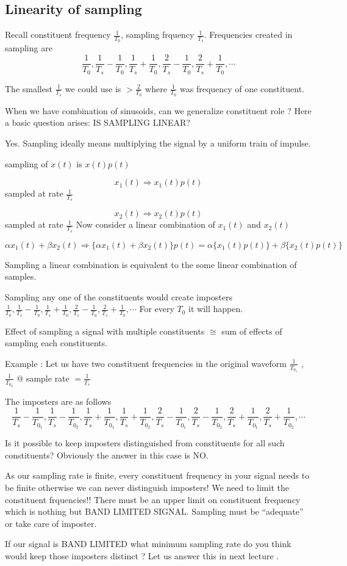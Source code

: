 \subsection{Linearity of sampling}
Recall constituent frequency $\frac{1}{T_0}$, sampling frquency $\frac{1}{T_s}$. Frequencies created in sampling are $$\frac{1}{T_0},\frac{1}{T_s}-\frac{1}{T_0},\frac{1}{T_s}+\frac{1}{T_0} ,\frac{2}{T_s}-\frac{1}{T_0},\frac{2}{T_s}+\frac{1}{T_0} , \cdots$$

The smallest $\frac{1}{T_s}$ we could use is $> \frac{2}{T_0}$ where $\frac{1}{T_0}$ was frequency of one constituent.

When we have combination of sinusoids, can we generalize constituent role ? 
Here a basic question arises: IS SAMPLING LINEAR?

Yes.
Sampling ideally means multiplying the signal by a uniform train of impulse.

sampling of $x(t)$ is $x(t)p(t)$

$$x_1(t) \Rightarrow x_1(t)p(t)$$ sampled at rate $\frac{1}{T_s}$

$$x_2(t) \Rightarrow x_2(t)p(t)$$ sampled at rate $\frac{1}{T_s}$
Now consider a linear combination of $x_1(t)$ and $x_2(t)$

$$\alpha x_1(t) + \beta x_2(t) \Rightarrow \{\alpha x_1(t)+ \beta x_2(t)\}p(t) =\alpha \{x_1(t)p(t)\}+ \beta \{x_2(t)p(t)\} $$

Sampling a linear combination is equivalent to the some linear combination of samples.

Sampling any one of the constituents would create imposters $\frac{1}{T_0},\frac{1}{T_s}-\frac{1}{T_0},\frac{1}{T_s}+\frac{1}{T_0} ,\frac{2}{T_s}-\frac{1}{T_0},\frac{2}{T_s}+\frac{1}{T_0} , \cdots$
For every $T_0$ it will happen.

Effect of sampling a signal with multiple constituents $\cong$ sum of effects of sampling each constituents.

Example : Let us have two constituent frequencies in the original waveform $\frac{1}{T_{0_1}}$ ,$\frac{1}{T_{0_2}}$ $@$ sample rate  $= \frac{1}{T_s}$


The imposters are as follows  $$\frac{1}{T_s}-\frac{1}{T_{0_1}},\frac{1}{T_s}-\frac{1}{T_{0_2}} ,\frac{1}{T_s}+\frac{1}{T_{0_1}},\frac{1}{T_s}+\frac{1}{T_{0_2}} ,\frac{2}{T_s}-\frac{1}{T_{0_1}},\frac{2}{T_s}-\frac{1}{T_{0_2}} ,\frac{2}{T_s}+\frac{1}{T_{0_1}},\frac{2}{T_s}+\frac{1}{T_{0_2}} , \cdots$$

Is it possible to keep imposters distinguished from constituents for all such constituents?
Obviously the answer in this case is NO.

As our sampling rate is finite, every constituent frequency in your signal needs to be finite otherwise we can never distinguish imposters! We need to limit the constituent frquencies!! 
There must be an upper limit on constituent frequency which is nothing but BAND LIMITED SIGNAL. Sampling must be ``adequate'' or take care of imposter.

If our signal is BAND LIMITED what minimum sampling rate do you think would keep those imposters distinct ? Let us answer this in next lecture .
